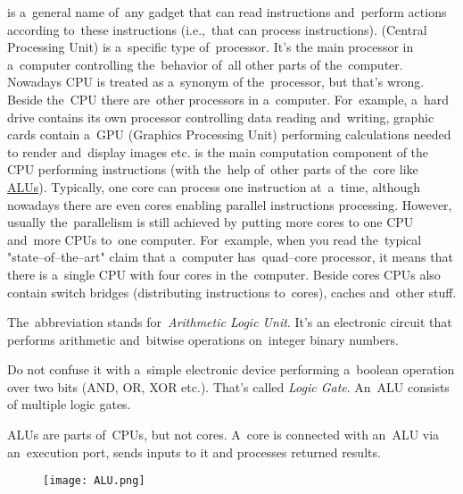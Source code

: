 \label{processorcpucore}
\begin{itemize}
     is a~general name of~any gadget that can read instructions and~perform actions according to~these instructions (i.e.,~that can process instructions).
     (Central Processing Unit) is a~specific type of~processor.
            It's the main processor in a~computer controlling the~behavior of~all other parts of the~computer.
            Nowadays CPU is treated as a~synonym of the~processor, but that's wrong.
            Beside the~CPU there are~other processors in a~computer.
            For~example, a~hard drive contains its own processor controlling data reading and~writing, graphic cards contain a~GPU (Graphics Processing Unit) performing calculations needed to render and~display images etc.
     is the main computation component of the CPU performing instructions (with the~help of~other parts of the~core like \hyperref[alu]{ALUs}).
            Typically, one core can process one instruction at~a~time, although nowadays there are even cores enabling parallel instructions processing.
            However, usually the~parallelism is still achieved by putting more cores to one CPU and~more CPUs to~one computer.
            For~example, when you read the~typical "state--of--the--art" claim that a~computer has~quad--core processor, it means that there is a~single CPU with four cores in the~computer.
            Beside cores CPUs also contain switch bridges (distributing instructions to~cores), caches and~other stuff.
\end{itemize}

\label{alu}
The~abbreviation stands for~\textit{Arithmetic Logic Unit}.
It's an electronic circuit that performs arithmetic and~bitwise operations on~integer binary numbers.

\warning Do not confuse it with a~simple electronic device performing a~boolean operation over two bits (AND, OR, XOR etc.).
That's called \textit{Logic Gate}.
An~ALU consists of multiple logic gates.

\warning ALUs are parts of~CPUs, but not cores.
A~core is connected with an~ALU via an~execution port, sends inputs to it and processes returned results.

\begin{figure}
    \centering
    \texttt{[image: ALU.png]}
\end{figure}
\newpage

